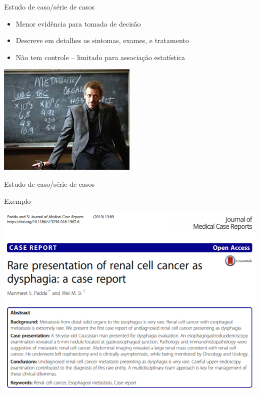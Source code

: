 \documentclass{beamer}
\begin{document}
\begin{frame}{Estudo de caso/série de casos}
  \begin{itemize}
    \small
  \item Menor evidência para tomada de decisão
    \bigskip
  \item Descreve em detalhes os sintomas, exames, e tratamento
    \bigskip
  \item Não tem controle -- limitado para associação estatística
  \end{itemize}
  \begin{center}
    \bigskip
    \bigskip
    \includegraphics[height=.4\textheight]{Metodos/house}
  \end{center}
\end{frame}

\begin{frame}{Estudo de caso/série de casos}
  \begin{exampleblock}{Exemplo}
    \begin{center}
      \includegraphics[width=.9\textwidth]{Metodos/exemplo-casereport}
    \end{center}
  \end{exampleblock}
\end{frame}
\end{document}
